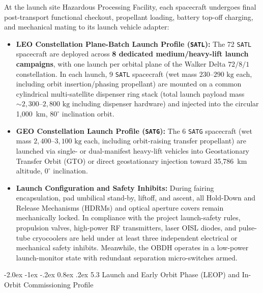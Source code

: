 \documentclass[11pt,a4paper]{article}
\makeatletter
\renewcommand\subsubsection{\@startsection{subsubsection}{3}{\z@}%
    {-2.0ex \@plus -1ex \@minus -.2ex}%
    {0.8ex \@plus .2ex}%
    {\normalfont\normalsize\bfseries\sffamily\color{SubHeadingBlue}}}
\providecommand{\abbr}[1]{#1}
\makeatother
\begin{document}
At the launch site Hazardous Processing Facility, each spacecraft undergoes final post-transport functional checkout, propellant loading, battery top-off charging, and mechanical mating to its launch vehicle adapter:
\begin{itemize}
    \item \textbf{\abbr{LEO} Constellation Plane-Batch Launch Profile (\texttt{SATL}):} The 72 \texttt{SATL} spacecraft are deployed across \textbf{8 dedicated medium/heavy-lift launch campaigns}, with one launch per orbital plane of the Walker Delta $72/8/1$ constellation. In each launch, 9 \texttt{SATL} spacecraft (wet mass $230\text{--}290\text{ kg}$ each, including orbit insertion/phasing propellant) are mounted on a common cylindrical multi-satellite dispenser ring stack (total launch payload mass $\sim 2{,}300\text{--}2{,}800\text{ kg}$ including dispenser hardware) and injected into the circular 1,000~km, $80^\circ$ inclination orbit.
    \item \textbf{\abbr{GEO} Constellation Launch Profile (\texttt{SATG}):} The 6 \texttt{SATG} spacecraft (wet mass $2{,}400\text{--}3{,}100\text{ kg}$ each, including orbit-raising transfer propellant) are launched via single- or dual-manifest heavy-lift vehicles into Geostationary Transfer Orbit (\abbr{GTO}) or direct geostationary injection toward 35,786~km altitude, $0^\circ$ inclination.
    \item \textbf{Launch Configuration and Safety Inhibits:} During fairing encapsulation, pad umbilical stand-by, liftoff, and ascent, all Hold-Down and Release Mechanisms (\abbr{HDRM}s) and optical aperture covers remain mechanically locked. In compliance with the project launch-safety rules, propulsion valves, high-power \abbr{RF} transmitters, laser \abbr{OISL} diodes, and pulse-tube cryocoolers are held under at least three independent electrical or mechanical safety inhibits. Meanwhile, the \abbr{OBDH} operates in a low-power launch-monitor state with redundant separation micro-switches armed.
\end{itemize}

\subsubsection{5.3 Launch and Early Orbit Phase (LEOP) and In-Orbit Commissioning Profile}
\end{document}
